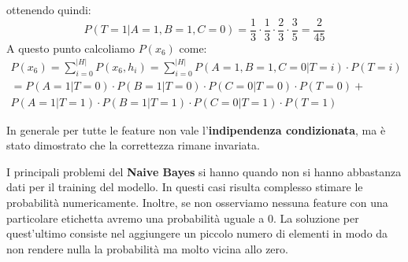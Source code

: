 \begin{esempio}
    ottenendo quindi:
    \begin{equation}
        P(T = 1 | A = 1, B = 1, C = 0) = \frac{1}{3} \cdot \frac{1}{3} \cdot
        \frac{2}{3} \cdot \frac{3}{5} = \frac{2}{45}
    \end{equation}
    A questo punto calcoliamo $P(x_6)$ come:
    \begin{equation}
        \begin{aligned}
            P(x_6) = \sum_{i = 0}^{|H|} P(x_6, h_i) = \sum_{i = 0}^{|H|}
            P(A =  1, B = 1, C = 0 | T = i) \cdot P(T = i) \\
            = P(A = 1 | T = 0) \cdot P(B = 1 | T = 0) \cdot P(C = 0 | T = 0)
            \cdot P(T = 0) +                               \\ P(A = 1 | T = 1)
            \cdot P(B = 1 | T = 1) \cdot P(C = 0 | T = 1) \cdot P(T = 1)
        \end{aligned}
    \end{equation}
\end{esempio}
In generale per tutte le feature non vale l'\textbf{indipendenza condizionata},
ma è stato dimostrato che la correttezza rimane invariata.

I principali problemi del \textbf{Naive Bayes} si hanno quando non si hanno
abbastanza dati per il training del modello. In questi casi risulta complesso
stimare le probabilità numericamente. Inoltre, se non osserviamo nessuna feature
con una particolare etichetta avremo una probabilità uguale a $0$. La soluzione
per quest'ultimo consiste nel aggiungere un piccolo numero di elementi in modo
da non rendere nulla la probabilità ma molto vicina allo zero.
